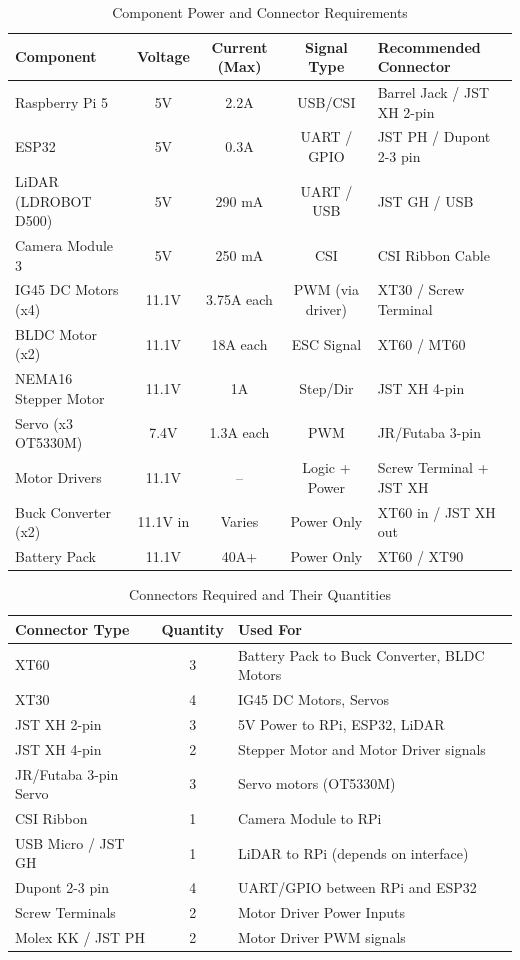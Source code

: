 \documentclass[12pt]{article}
\begin{document}
\begin{table}[H]
\centering
\begin{tabular}{|l|c|c|c|l|}
\hline
\textbf{Component} & \textbf{Voltage} & \textbf{Current (Max)} & \textbf{Signal Type} & \textbf{Recommended Connector} \\
\hline
Raspberry Pi 5 & 5V & 2.2A & USB/CSI & Barrel Jack / JST XH 2-pin \\
ESP32 & 5V & 0.3A & UART / GPIO & JST PH / Dupont 2-3 pin \\
LiDAR (LDROBOT D500) & 5V & 290 mA & UART / USB & JST GH / USB \\
Camera Module 3 & 5V & 250 mA & CSI & CSI Ribbon Cable \\
IG45 DC Motors (x4) & 11.1V & 3.75A each & PWM (via driver) & XT30 / Screw Terminal \\
BLDC Motor (x2) & 11.1V & 18A each & ESC Signal & XT60 / MT60 \\
NEMA16 Stepper Motor & 11.1V & 1A & Step/Dir & JST XH 4-pin \\
Servo (x3 OT5330M) & 7.4V & 1.3A each & PWM & JR/Futaba 3-pin \\
Motor Drivers & 11.1V & -- & Logic + Power & Screw Terminal + JST XH \\
Buck Converter (x2) & 11.1V in & Varies & Power Only & XT60 in / JST XH out \\
Battery Pack & 11.1V & 40A+ & Power Only & XT60 / XT90 \\
\hline
\end{tabular}
\caption{Component Power and Connector Requirements}
\end{table}

\begin{table}[H]
\centering
\begin{tabular}{|l|c|p{6.5cm}|}
\hline
\textbf{Connector Type} & \textbf{Quantity} & \textbf{Used For} \\
\hline
XT60 & 3 & Battery Pack to Buck Converter, BLDC Motors \\
XT30 & 4 & IG45 DC Motors, Servos \\
JST XH 2-pin & 3 & 5V Power to RPi, ESP32, LiDAR \\
JST XH 4-pin & 2 & Stepper Motor and Motor Driver signals \\
JR/Futaba 3-pin Servo & 3 & Servo motors (OT5330M) \\
CSI Ribbon & 1 & Camera Module to RPi \\
USB Micro / JST GH & 1 & LiDAR to RPi (depends on interface) \\
Dupont 2-3 pin & 4 & UART/GPIO between RPi and ESP32 \\
Screw Terminals & 2 & Motor Driver Power Inputs \\
Molex KK / JST PH & 2 & Motor Driver PWM signals \\
\hline
\end{tabular}
\caption{Connectors Required and Their Quantities}
\end{table}
\end{document}

